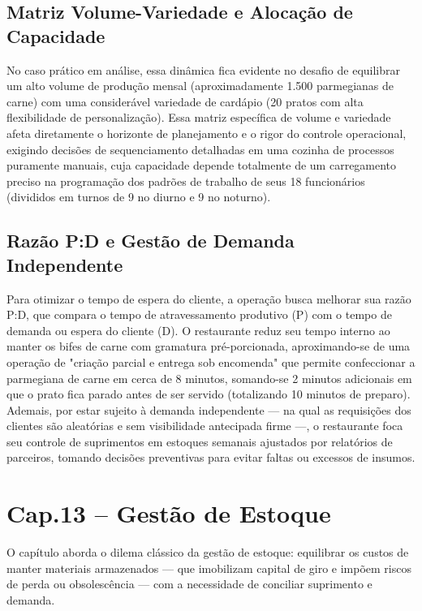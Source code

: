 \documentclass[12pt, a4paper]{article}
\begin{document}
\subsection{Matriz Volume-Variedade e Alocação de Capacidade}
No caso prático em análise, essa dinâmica fica evidente no desafio de equilibrar um alto volume de produção mensal (aproximadamente 1.500 parmegianas de carne) com uma considerável variedade de cardápio (20 pratos com alta flexibilidade de personalização). Essa matriz específica de volume e variedade afeta diretamente o horizonte de planejamento e o rigor do controle operacional, exigindo decisões de sequenciamento detalhadas em uma cozinha de processos puramente manuais, cuja capacidade depende totalmente de um carregamento preciso na programação dos padrões de trabalho de seus 18 funcionários (divididos em turnos de 9 no diurno e 9 no noturno).

\subsection{Razão P:D e Gestão de Demanda Independente}
Para otimizar o tempo de espera do cliente, a operação busca melhorar sua razão P:D, que compara o tempo de atravessamento produtivo (P) com o tempo de demanda ou espera do cliente (D). O restaurante reduz seu tempo interno ao manter os bifes de carne com gramatura pré-porcionada, aproximando-se de uma operação de "criação parcial e entrega sob encomenda" que permite confeccionar a parmegiana de carne em cerca de 8 minutos, somando-se 2 minutos adicionais em que o prato fica parado antes de ser servido (totalizando 10 minutos de preparo). Ademais, por estar sujeito à demanda independente — na qual as requisições dos clientes são aleatórias e sem visibilidade antecipada firme —, o restaurante foca seu controle de suprimentos em estoques semanais ajustados por relatórios de parceiros, tomando decisões preventivas para evitar faltas ou excessos de insumos.

\section{Cap.13 – Gestão de Estoque}

O capítulo aborda o dilema clássico da gestão de estoque: equilibrar os custos de manter materiais armazenados — que imobilizam capital de giro e impõem riscos de perda ou obsolescência — com a necessidade de conciliar suprimento e demanda.
\end{document}
